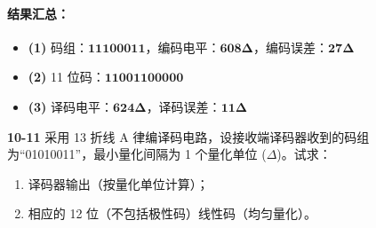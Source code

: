 \documentclass[a4paper,11pt]{ctexart}
\begin{document}
    \paragraph{结果汇总：}
    \begin{itemize}
        \item \textbf{(1)} 码组：$\mathbf{11100011}$，编码电平：$\mathbf{608\Delta}$，编码误差：$\mathbf{27\Delta}$
        \item \textbf{(2)} 11 位码：$\mathbf{11001100000}$
        \item \textbf{(3)} 译码电平：$\mathbf{624\Delta}$，译码误差：$\mathbf{11\Delta}$
    \end{itemize}

\vspace{2em}

\noindent \textbf{10-11} 采用 13 折线 A 律编译码电路，设接收端译码器收到的码组为“01010011”，最小量化间隔为 1 个量化单位 ($\Delta$)。试求：
\begin{enumerate}[label=(\arabic*)]
    \item 译码器输出（按量化单位计算）；
    \item 相应的 12 位（不包括极性码）线性码（均匀量化）。
\end{enumerate}
\end{document}
